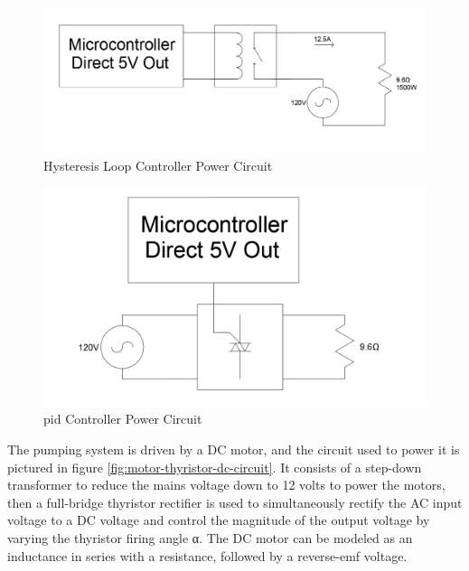 \documentclass{article}
\begin{document}
\begin{figure}[H]
\begin{center}
\includegraphics[scale=0.20]{heater-hysteresis-circuit.png}
\caption{Hysteresis Loop Controller Power Circuit}
\label{fig:heater-hysteresis-circuit}
\end{center}
\end{figure}

\begin{figure}[H]
\begin{center}
\includegraphics[scale=0.20]{heater-pid-circuit.png}
\caption{\gls{pid} Controller Power Circuit}
\label{fig:heater-pid-circuit}
\end{center}
\end{figure}

\noindent The pumping system is driven by a DC motor, and the circuit used to power it is pictured in figure \ref{fig:motor-thyristor-dc-circuit}. It consists of a step-down transformer to reduce the mains voltage down to 12 volts to power the motors, then a full-bridge thyristor rectifier is used to simultaneously rectify the AC input voltage to a DC voltage and control the magnitude of the output voltage by varying the thyristor firing angle α. The DC motor can be modeled as an inductance in series with a resistance, followed by a reverse-emf voltage.
\end{document}
